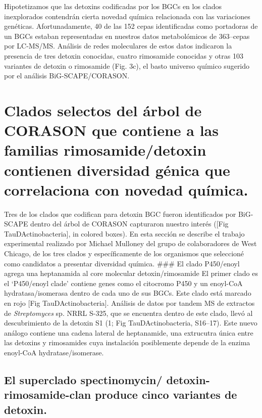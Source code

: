 \documentclass[12pt,twoside]{reedthesis}
\begin{document}
  Hipotetizamos que las detoxins codificadas por los BGCs en los clados
  inexplorados contendrán cierta novedad química relacionada con las
  variaciones genéticas. Afortunadamente, 40 de las 152 cepas
  identificadas como portadoras de un BGCs estaban representadas en
  nuestros datos metabolómicos de 363--cepas por LC-MS/MS. Análisis de
  redes moleculares de estos datos indicaron la presencia de tres detoxin
  conocidas, cuatro rimosamide conocidas y otras 103 variantes de detoxin
  o rimosamide (Fig. 3c), el basto universo químico sugerido por el
  análisis BiG-SCAPE/CORASON.
  
  \section{Clados selectos del árbol de CORASON que contiene a las
  familias rimosamide/detoxin contienen diversidad génica que correlaciona
  con novedad
  química.}\label{clados-selectos-del-arbol-de-corason-que-contiene-a-las-familias-rimosamidedetoxin-contienen-diversidad-genica-que-correlaciona-con-novedad-quimica.}
  
  Tres de los clados que codifican para detoxin BGC fueron identificados
  por BiG-SCAPE dentro del árbol de CORASON capturaron nuestro interés
  ({[}Fig TauDActinobacteria{]}, in colored boxes). En esta sección se
  describe el trabajo experimental realizado por Michael Mulloney del
  grupo de colaboradores de West Chicago, de los tres clados y
  específicamente de los organismos que seleccioné como candidatos a
  presentar diversidad química. \#\#\# El clado P450/enoyl agrega una
  heptanamida al core molecular detoxin/rimosamide El primer clado es el
  `P450/enoyl clade' contiene genes como el citocromo P450 y un enoyl-CoA
  hydratasa/isomerasa dentro de cada uno de sus BGCs. Este clado está
  marcado en rojo {[}Fig TauDActinobacteria{]}. Análisis de datos por
  tandem MS de extractos de \emph{Streptomyces} sp. NRRL S-325, que se
  encuentra dentro de este clado, llevó al descubrimiento de la detoxin S1
  (1; Fig TauDActinobacteria, S16--17). Este nuevo análogo contiene una
  cadena lateral de heptanamide, una extrucutra única entre las detoxins y
  rimosamides cuya instalación posiblemente depende de la enzima enoyl-CoA
  hydratase/isomerase.
  
  \subsection{El superclado spectinomycin/ detoxin-rimosamide-clan produce
  cinco variantes de
  detoxin.}\label{el-superclado-spectinomycin-detoxin-rimosamide-clan-produce-cinco-variantes-de-detoxin.}
  
\end{document}
